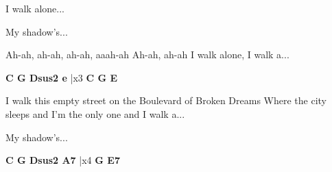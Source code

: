 \documentclass[../../../songbook.tex]{subfiles}
\begin{document}
I walk alone...				 \newline

\-\hspace{1cm} My shadow's...				 \newline

Ah-ah, ah-ah, ah-ah, aaah-ah				 \newline
Ah-ah, ah-ah I walk alone, I walk a...				 \newline

{\color{red}\textbf{C G Dsus2 e} } |x3 {\color{red}\textbf{ C G E} } \newline

I walk this empty street on the Boulevard of Broken Dreams				 \newline
Where the city sleeps and I'm the only one and I walk a...				 \newline

\-\hspace{1cm} My shadow's...				 \newline

{\color{red}\textbf{C G Dsus2 A7} } |x4 {\color{red}\textbf{ G E7} } \newline
\end{document}
